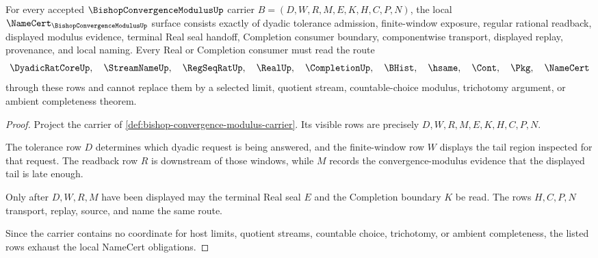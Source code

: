 \begin{theorem}
\label{thm:bishop-convergence-modulus-namecert-obligations}
For every accepted $\BishopConvergenceModulusUp$ carrier $B=(D,W,R,M,E,K,H,C,P,N)$, the local $\NameCert_{\BishopConvergenceModulusUp}$ surface consists exactly of dyadic tolerance admission, finite-window exposure, regular rational readback, displayed modulus evidence, terminal Real seal handoff, Completion consumer boundary, componentwise transport, displayed replay, provenance, and local naming. Every Real or Completion consumer must read the route
$$
\DyadicRatCoreUp,\quad \StreamNameUp,\quad \RegSeqRatUp,\quad \RealUp,\quad \CompletionUp,\quad \BHist,\quad \hsame,\quad \Cont,\quad \Pkg,\quad \NameCert
$$
through these rows and cannot replace them by a selected limit, quotient stream, countable-choice modulus, trichotomy argument, or ambient completeness theorem.
\end{theorem}
\begin{proof}
Project the carrier of \autoref{def:bishop-convergence-modulus-carrier}. Its visible rows are precisely $D,W,R,M,E,K,H,C,P,N$.

The tolerance row $D$ determines which dyadic request is being answered, and the finite-window row $W$ displays the tail region inspected for that request. The readback row $R$ is downstream of those windows, while $M$ records the convergence-modulus evidence that the displayed tail is late enough.

Only after $D,W,R,M$ have been displayed may the terminal Real seal $E$ and the Completion boundary $K$ be read. The rows $H,C,P,N$ transport, replay, source, and name the same route.

Since the carrier contains no coordinate for host limits, quotient streams, countable choice, trichotomy, or ambient completeness, the listed rows exhaust the local NameCert obligations.
\end{proof}

